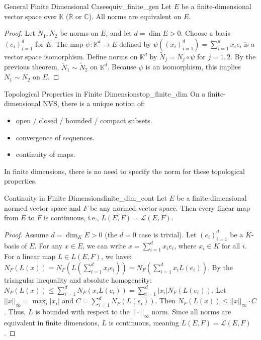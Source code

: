 \documentclass[11pt, a4paper]{article}
\newcommand{\R}{\mathbb{R}}
\newcommand{\C}{\mathbb{C}}
\begin{document}
\begin{corollary}{General Finite Dimensional Case}{equiv_finite_gen}
Let $E$ be a finite-dimensional vector space over $\mathbb{K}$ ($\R$ or $\C$). All norms are equivalent on $E$.
\end{corollary}
\begin{proof}
Let $N_1, N_2$ be norms on $E$, and let $d = \dim E > 0$.
Choose a basis $(e_i)_{i=1}^d$ for $E$. The map $\psi: \mathbb{K}^d \to E$ defined by $\psi((x_i)_{i=1}^d) = \sum_{i=1}^d x_i e_i$ is a vector space isomorphism.
Define norms on $\mathbb{K}^d$ by $\tilde{N}_j = N_j \circ \psi$ for $j=1,2$.
By the previous theorem, $\tilde{N}_1 \sim \tilde{N}_2$ on $\mathbb{K}^d$. Because $\psi$ is an isomorphism, this implies $N_1 \sim N_2$ on $E$.
\end{proof}

\begin{corollary}{Topological Properties in Finite Dimensions}{top_finite_dim}
On a finite-dimensional NVS, there is a unique notion of:
\begin{itemize}
    \item open / closed / bounded / compact subsets.
    \item convergence of sequences.
    \item continuity of maps.
\end{itemize}
In finite dimensions, there is no need to specify the norm for these topological properties.
\end{corollary}

\begin{corollary}{Continuity in Finite Dimensions}{finite_dim_cont}
Let $E$ be a finite-dimensional normed vector space and $F$ be any normed vector space. Then every linear map from $E$ to $F$ is continuous, i.e., $L(E,F) = \mathcal{L}(E,F)$.
\end{corollary}
\begin{proof}
Assume $d = \dim_K E > 0$ (the $d=0$ case is trivial). Let $(e_i)_{i=1}^d$ be a $K$-basis of $E$.
For any $x \in E$, we can write $x = \sum_{i=1}^d x_i e_i$, where $x_i \in K$ for all $i$.
For a linear map $L \in L(E, F)$, we have:
$N_F(L(x)) = N_F\left(L\left(\sum_{i=1}^d x_i e_i\right)\right) = N_F\left(\sum_{i=1}^d x_i L(e_i)\right)$.
By the triangular inequality and absolute homogeneity:
$N_F(L(x)) \le \sum_{i=1}^d N_F(x_i L(e_i)) = \sum_{i=1}^d |x_i| N_F(L(e_i))$.
Let $||x||_\infty = \max_i |x_i|$ and $C = \sum_{i=1}^d N_F(L(e_i))$. Then $N_F(L(x)) \le ||x||_\infty \cdot C$.
Thus, $L$ is bounded with respect to the $||\cdot||_\infty$ norm. Since all norms are equivalent in finite dimensions, $L$ is continuous, meaning $L(E, F) = \mathcal{L}(E, F)$.
\end{proof}
\end{document}
